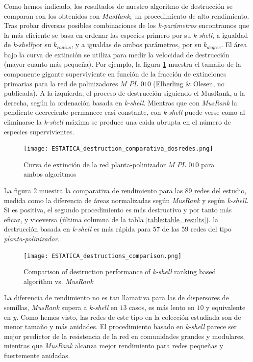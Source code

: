 Como hemos indicado, los resultados de nuestro algoritmo de destrucción se comparan con los obtenidos con \textit{MusRank}, un procedimiento de alto rendimiento. Tras probar diversas posibles combinaciones de los \textit{k-parámetros} encontramos que la más eficiente se basa en ordenar las especies primero por su \textit{k-shell}, a igualdad de  \textit{k-shell}por su $k_{radius}$, y a igualdas de ambos parámetros, por su $k_{degree}$. El área bajo la curva de extinción se utiliza para medir la velocidad de destrucción (mayor cuanto más pequeña). Por ejemplo, la figura \ref{fig:ESTATICA_destruction_comparativa_dosredes} muestra el tamaño de la componente gigante superviviente en función de la fracción de extinciones primarias para la red de polinizadores $M\_PL\_010$ (Elberling \& Olesen, no publicada). A la izquierda, el proceso de destrucción siguiendo el {MusRank}, a la derecha, según la ordenación basada en \textit{k-shell}. Mientras que con \textit{MusRank} la pendiente decreciente permanece casi constante, con \textit{k-shell} puede verse como al eliminarse la \textit{k-shell} máxima se produce una caída abrupta en el número de especies supervivientes.

\begin{figure}[h!]
\centering
\texttt{[image: ESTATICA\_destruction\_comparativa\_dosredes.png]}
\caption {Curva de extinción de la red planta-polinizador $M\_PL\_010$ para ambos algoritmos}
\label{fig:ESTATICA_destruction_comparativa_dosredes}
\end{figure}

La figura \ref{fig:ESTATICA_destructions_comparison} muestra la comparativa de rendimiento para las $89$ redes del estudio, medida como la diferencia de áreas normalizadas según \textit{MusRank} y según \textit{k-shell}. Si es positiva, el segundo procedimiento es más destructivo y por tanto más eficaz, y viceversa (última columna de la tabla \ref{table:table_results}). la destrucción basada en \textit{k-shell} es más rápida para $57$ de las $59$ redes del tipo \textit{planta-polinizador}. 

\begin{figure}[h!]
\centering
\texttt{[image: ESTATICA\_destructions\_comparison.png]}
\caption {Comparison of destruction performance of \textit{k-shell} ranking based algorithm vs. \textit{MusRank}}
\label{fig:ESTATICA_destructions_comparison}
\end{figure}

La diferencia de rendimiento no es tan llamativa para las de dispersores de semillas, \textit{MusRank} supera a \textit{k-shell} en $13$ casos, es más lento en $10$ y equivalente en $y$. Como hemos visto, las redes de este tipo en la colección estudiada son de menor tamaño y más anidades. El procedimiento basado en \textit{k-shell} parece ser mejor predictor de la resistencia de la red en comunidades grandes y modulares, mientras que \textit{MusRank} alcanza mejor rendimiento para redes pequeñas y fuertemente anidadas.

